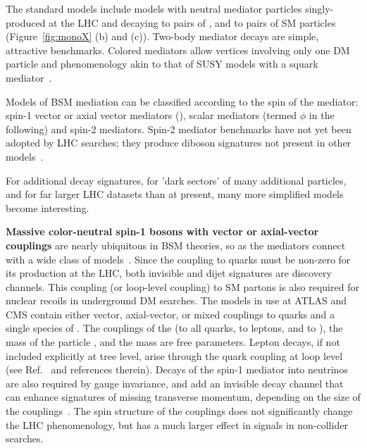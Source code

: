 The standard models include models with neutral mediator particles singly-produced at the LHC and decaying to pairs of \IP, and to pairs of SM particles (Figure~\ref{fig:monoX} (b) and (c)). Two-body mediator decays are simple, attractive benchmarks. Colored mediators allow vertices involving only one DM particle and phenomenology akin to that of SUSY models with a squark mediator~\cite{Papucci:2014iwa,An:2013xka,Bell:2012rg}. 

Models of BSM mediation can be classified according to the spin of the mediator: spin-1 vector or axial vector mediators (\Zprime), scalar mediators (termed $\phi$ in the following) and spin-2 mediators. Spin-2 mediator benchmarks have not yet been adopted by LHC searches; they produce diboson signatures not present in other models~\cite{Han:2015cty}. %

For additional decay signatures, for 'dark sectors' of many additional particles, and for far larger LHC datasets than at present, many more simplified models become interesting. 



\textbf{Massive color-neutral spin-1 bosons with vector or axial-vector couplings} are nearly ubiquitous in BSM theories, so \Zprime as the mediators connect with a wide class of models~\cite{Shoemaker:2011vi}.
Since the \Zprime coupling to quarks must be non-zero for its production at the LHC, both invisible and dijet signatures are discovery channels.
This coupling (or loop-level coupling) to SM partons is also required for nuclear recoils in underground DM searches.
The models in use at ATLAS and CMS contain either vector, axial-vector, or mixed couplings to quarks and a single species of \IP.
The couplings of the \Zprime (\gq to all quarks, \gl to leptons, and \gDM to \IP), the mass of the \IP particle \mdm, and the \Zprime mass \mmed are free parameters.
Lepton decays, if not included explicitly at tree level, arise through the quark coupling at loop level (see Ref.~\cite{Albert:2017onk} and references therein). Decays of the spin-1 mediator into neutrinos are also required by gauge invariance, and add an invisible decay channel that can enhance signatures of missing transverse momentum, depending on the size of the couplings~\cite{Albert:2017onk}. 
The spin structure of the \Zprime couplings does not significantly change the LHC phenomenology, but has a much larger effect in signals in non-collider searches. 


